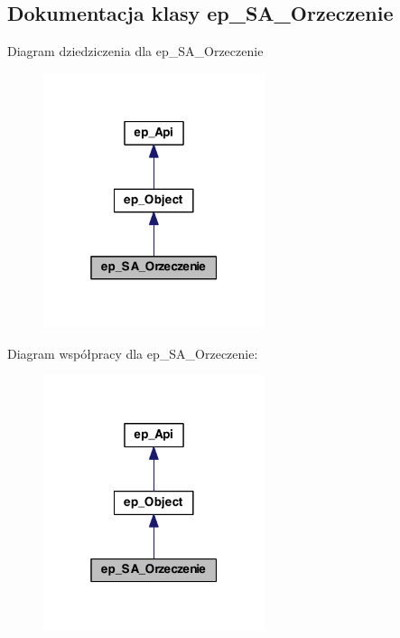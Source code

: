 \hypertarget{classep___s_a___orzeczenie}{\subsection{Dokumentacja klasy ep\-\_\-\-S\-A\-\_\-\-Orzeczenie}
\label{classep___s_a___orzeczenie}
}


Diagram dziedziczenia dla ep\-\_\-\-S\-A\-\_\-\-Orzeczenie\nopagebreak
\begin{figure}[H]
\begin{center}
\leavevmode
\includegraphics[width=184pt]{classep___s_a___orzeczenie__inherit__graph}
\end{center}
\end{figure}


Diagram współpracy dla ep\-\_\-\-S\-A\-\_\-\-Orzeczenie\-:\nopagebreak
\begin{figure}[H]
\begin{center}
\leavevmode
\includegraphics[width=184pt]{classep___s_a___orzeczenie__coll__graph}
\end{center}
\end{figure}
